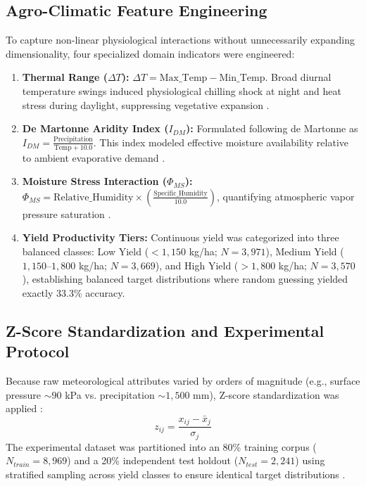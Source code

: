 \documentclass[conference]{IEEEtran}
\begin{document}
\subsection{Agro-Climatic Feature Engineering}
To capture non-linear physiological interactions without unnecessarily expanding dimensionality, four specialized domain indicators were engineered:
\begin{enumerate}
    \item \textbf{Thermal Range ($\Delta T$):} $\Delta T = \text{Max\_Temp} - \text{Min\_Temp}$. Broad diurnal temperature swings induced physiological chilling shock at night and heat stress during daylight, suppressing vegetative expansion \cite{schlenker2009}.
    \item \textbf{De Martonne Aridity Index ($I_{DM}$):} Formulated following de Martonne \cite{demartonne1926} as $I_{DM} = \frac{\text{Precipitation}}{\text{Temp} + 10.0}$. This index modeled effective moisture availability relative to ambient evaporative demand \cite{demartonne1926, lobell2008}.
    \item \textbf{Moisture Stress Interaction ($\Phi_{MS}$):} $\Phi_{MS} = \text{Relative\_Humidity} \times \left( \frac{\text{Specific\_Humidity}}{10.0} \right)$, quantifying atmospheric vapor pressure saturation \cite{schlenker2009}.
    \item \textbf{Yield Productivity Tiers:} Continuous yield was categorized into three balanced classes: Low Yield ($< 1,150$ kg/ha; $N=3,971$), Medium Yield ($1,150$--$1,800$ kg/ha; $N=3,669$), and High Yield ($> 1,800$ kg/ha; $N=3,570$), establishing balanced target distributions where random guessing yielded exactly 33.3\% accuracy.
\end{enumerate}

\subsection{Z-Score Standardization and Experimental Protocol}
Because raw meteorological attributes varied by orders of magnitude (e.g., surface pressure $\sim 90$ kPa vs. precipitation $\sim 1,500$ mm), Z-score standardization was applied \cite{hastie2009}:
\begin{equation}
z_{ij} = \frac{x_{ij} - \bar{x}_j}{\sigma_j}
\end{equation}
The experimental dataset was partitioned into an 80\% training corpus ($N_{train} = 8,969$) and a 20\% independent test holdout ($N_{test} = 2,241$) using stratified sampling across yield classes to ensure identical target distributions \cite{hastie2009}.
\end{document}
